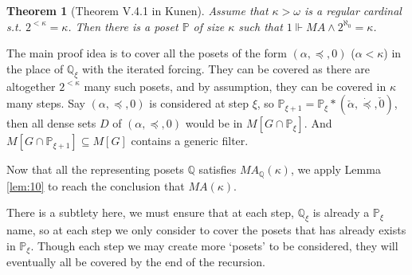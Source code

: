 \documentclass{article}
\newtheorem{theorem}{Theorem}
\newcommand{\bbP}{\mathbb{P}}
\newcommand{\bbQ}{\mathbb{Q}}
\begin{document}
\begin{theorem}[Theorem V.4.1 in Kunen]\label{thm:consistency-MA}
    Assume that $\kappa>\omega$ is a regular cardinal s.t. $2^{<\kappa} = \kappa$. Then there is a poset $\bbP$ of size $\kappa$ such that $1\Vdash MA\land 2^{\aleph_0} = \kappa$.
\end{theorem}

The main proof idea is to cover all the posets of the form $(\alpha,\preceq,0)$ ($\alpha<\kappa$) in the place of $\mathbb{Q}_\xi$ with the iterated forcing. They can be covered as there are altogether $2^{<\kappa}$ many such posets, and by assumption, they can be covered in $\kappa$ many steps. Say $(\alpha,\preceq,0)$ is considered at step $\xi$, so $\bbP_{\xi+1} = \bbP_{\xi}*(\check{\alpha},\dot{\preceq},\check{0})$, then all dense sets $D$ of $(\alpha,\preceq,0)$ would be in $M[G\cap \bbP_\xi]$. And $M[G\cap \bbP_{\xi+1}]\subseteq M[G]$ contains a generic filter.

Now that all the representing posets $\bbQ$ satisfies $MA_\bbQ(\kappa)$, we apply Lemma \ref{lem:10} to reach the conclusion that $MA(\kappa)$.

There is a subtlety here, we must ensure that at each step, $\bbQ_\xi$ is already a $\bbP_\xi$ name, so at each step we only consider to cover the posets that has already exists in $\bbP_\xi$. Though each step we may create more `posets' to be considered, they will eventually all be covered by the end of the recursion.
\end{document}
